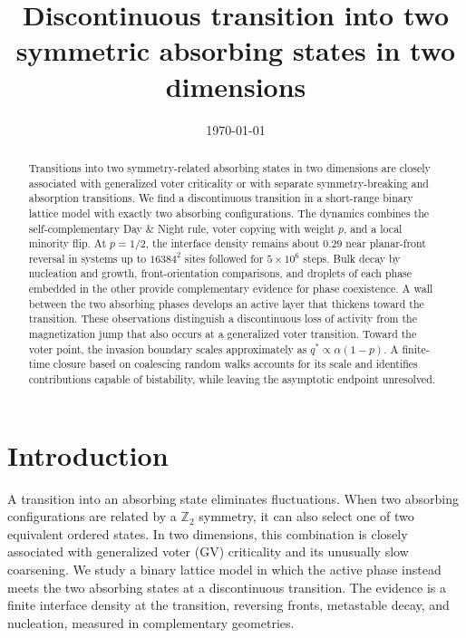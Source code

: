 \documentclass[pre,twocolumn,superscriptaddress,showpacs,floatfix]{revtex4-2}
\begin{document}
\title{Discontinuous transition into two symmetric absorbing states in two dimensions}

\date{\today}

\begin{abstract}
Transitions into two symmetry-related absorbing states in two dimensions are closely
associated with generalized voter criticality or with separate symmetry-breaking and
absorption transitions. We find a discontinuous transition in a short-range binary
lattice model with exactly two absorbing configurations. The dynamics combines the
self-complementary Day \& Night rule, voter copying with weight $p$, and a local minority
flip. At $p=1/2$, the interface density remains about 0.29 near planar-front
reversal in systems up to $16384^2$ sites followed for $5\times10^6$ steps.
Bulk decay by nucleation and growth, front-orientation comparisons,
and droplets of each phase embedded in the other provide complementary evidence for
phase coexistence. A wall between the two absorbing phases develops an active layer
that thickens toward the transition. These observations distinguish a discontinuous
loss of activity from the magnetization jump that also occurs at a generalized voter
transition. Toward the voter point, the invasion boundary scales approximately as
$q^*\propto\alpha(1-p)$. A finite-time closure based on coalescing random walks accounts
for its scale and identifies contributions capable of bistability, while leaving the
asymptotic endpoint unresolved.
\end{abstract}

\maketitle

\section{Introduction}
\label{sec:intro}

A transition into an absorbing state eliminates fluctuations. When two absorbing
configurations are related by a $\mathbb{Z}_2$ symmetry, it can also select one of two
equivalent ordered states. In two dimensions, this combination is closely associated with
generalized voter (GV) criticality and its unusually slow coarsening. We study a binary
lattice model in which the active phase instead meets the two absorbing states at a
discontinuous transition. The evidence is a finite interface density at the transition,
reversing fronts, metastable decay, and nucleation, measured in complementary geometries.
\end{document}
